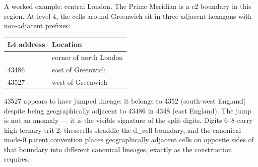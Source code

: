 \documentclass[
  11pt,
  a4paper,
]{article}
\newcounter{none} %
\begin{document}
A worked example: central London. The Prime Meridian is a c2 boundary in
this region. At level 4, the cells around Greenwich sit in three
adjacent hexagons with non-adjacent prefixes:

{\def\LTcaptype{none} %
\begin{longtable}[]{@{}ll@{}}
\toprule\noalign{}
L4 address & Location \\
\midrule\noalign{}
\endhead
\bottomrule\noalign{}
\endlastfoot
43483 & corner of north London \\
43486 & east of Greenwich \\
43527 & west of Greenwich \\
\end{longtable}
}

43527 appears to have jumped lineage: it belongs to 4352 (south-west
England) despite being geographically adjacent to 43486 in 4348 (east
England). The jump is not an anomaly --- it is the visible signature of
the split digits. Digits 6--8 carry high ternary trit 2: thesecells
straddle the d\_cell boundary, and the canonical mode-0 parent
convention places geographically adjacent cells on opposite sides of
that boundary into different canonical lineages, exactly as the
construction requires.
\end{document}
